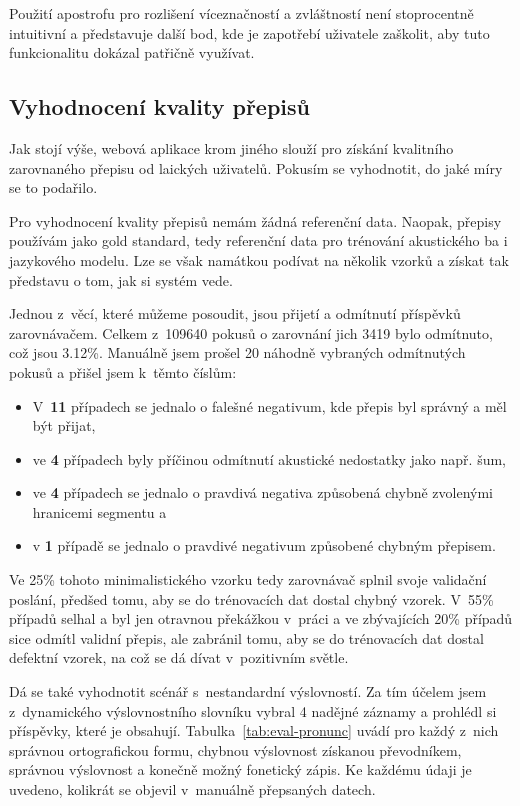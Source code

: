 Použití apostrofu pro rozlišení víceznačností a zvláštností není stoprocentně
intuitivní a představuje další bod, kde je zapotřebí uživatele zaškolit, aby
tuto funkcionalitu dokázal patřičně využívat.

\subsection{Vyhodnocení kvality přepisů}

Jak stojí výše, webová aplikace krom jiného slouží pro získání kvalitního
zarovnaného přepisu od laických uživatelů. Pokusím se vyhodnotit, do jaké míry
se to podařilo.

Pro vyhodnocení kvality přepisů nemám žádná referenční data. Naopak, přepisy
používám jako gold standard, tedy referenční data pro trénování akustického ba i
jazykového modelu. Lze se však namátkou podívat na několik vzorků a získat tak
představu o tom, jak si systém vede.

Jednou z~věcí, které můžeme posoudit, jsou přijetí a odmítnutí příspěvků
zarovnávačem. Celkem z~109640 pokusů o zarovnání jich 3419 bylo odmítnuto, což
jsou 3.12\%. Manuálně jsem prošel 20 náhodně vybraných odmítnutých pokusů a
přišel jsem k~těmto číslům:
\begin{itemize}
\item{
    V~\textbf{11} případech se jednalo o falešné negativum, kde přepis byl
    správný a měl být přijat,
}
\item{
    ve \textbf{4} případech byly příčinou odmítnutí akustické nedostatky jako
    např. šum,
}
\item{
    ve \textbf{4} případech se jednalo o pravdivá negativa způsobená chybně
    zvolenými hranicemi segmentu a
}
\item{
     v \textbf{1} případě se jednalo o pravdivé negativum způsobené chybným
    přepisem.
}
\end{itemize}

Ve 25\% tohoto minimalistického vzorku tedy zarovnávač splnil svoje validační
poslání, předšed tomu, aby se do trénovacích dat dostal chybný vzorek. V~55\%
případů selhal a byl jen otravnou překážkou v~práci a ve zbývajících 20\%
případů sice odmítl validní přepis, ale zabránil tomu, aby se do trénovacích dat
dostal defektní vzorek, na což se dá dívat v~pozitivním světle.

Dá se také vyhodnotit scénář s~nestandardní výslovností. Za tím účelem jsem
z~dynamického výslovnostního slovníku vybral 4 nadějné záznamy a prohlédl si
příspěvky, které je obsahují. Tabulka~\ref{tab:eval-pronunc} uvádí pro každý
z~nich správnou ortografickou formu, chybnou výslovnost získanou převodníkem,
správnou výslovnost a konečně možný fonetický zápis. Ke každému údaji je uvedeno,
kolikrát se objevil v~manuálně přepsaných datech.

